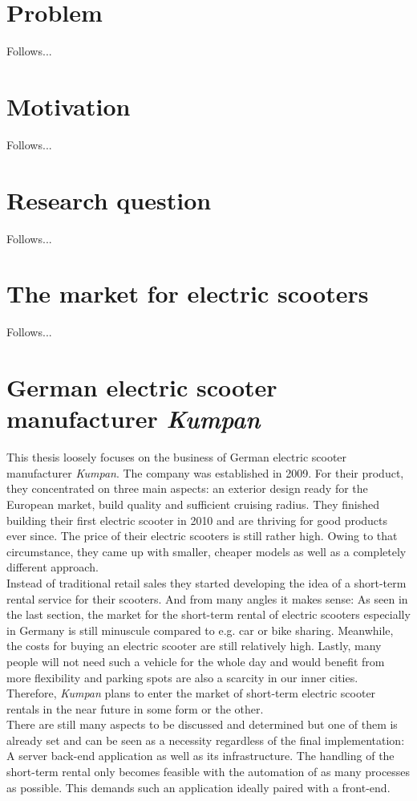 \documentclass[12pt,a4paper]{report}
\begin{document}
\section{Problem}

Follows...


\section{Motivation}

Follows...


\section{Research question}

Follows...


\section{The market for electric scooters}

Follows...


\section{German electric scooter manufacturer \emph{Kumpan}}

This thesis loosely focuses on the business of German electric scooter manufacturer \emph{Kumpan}.
The company was established in 2009. For their product, they concentrated on three main aspects:
an exterior design ready for the European market, build quality and sufficient cruising radius.
They finished building their first electric scooter in 2010 and are thriving for good products ever since.
The price of their electric scooters is still rather high. Owing to that circumstance,
they came up with smaller, cheaper models as well as a completely different approach.\\
Instead of traditional retail sales they started developing the idea of a
short-term rental service for their scooters. And from many angles it makes sense:
As seen in the last section, the market for the short-term rental of electric scooters
especially in Germany is still minuscule compared to e.g. car or bike sharing.
Meanwhile, the costs for buying an electric scooter are still relatively high.
Lastly, many people will not need such a vehicle for the whole day and would benefit
from more flexibility and parking spots are also a scarcity in our inner cities.
Therefore, \emph{Kumpan} plans to enter the market of short-term electric scooter rentals
in the near future in some form or the other.\\
There are still many aspects to be discussed and determined but one of them
is already set and can be seen as a necessity regardless of the final implementation:
A server back-end application as well as its infrastructure.
The handling of the short-term rental only becomes feasible with the automation
of as many processes as possible. This demands such an application ideally paired
with a front-end.
\end{document}
